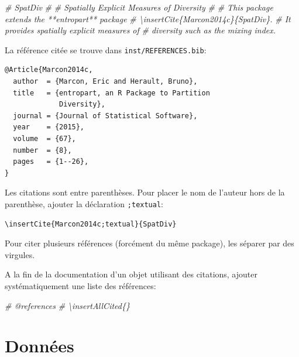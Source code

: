\documentclass[
  11pt,
  french,
  a4paper,
  extrafontsizes,onecolumn,openright
  ]{memoir}
\newenvironment{Shaded}{\begin{snugshade}}{\end{snugshade}}
\newcommand{\CommentTok}[1]{\textcolor[rgb]{0.56,0.35,0.01}{\textit{#1}}}
\begin{document}
\scriptsize

\begin{Shaded}
\begin{Highlighting}[]
\CommentTok{\#\textquotesingle{} SpatDiv}
\CommentTok{\#\textquotesingle{}}
\CommentTok{\#\textquotesingle{} Spatially Explicit Measures of Diversity}
\CommentTok{\#\textquotesingle{} }
\CommentTok{\#\textquotesingle{} This package extends the **entropart** package}
\CommentTok{\#\textquotesingle{} \textbackslash{}insertCite\{Marcon2014c\}\{SpatDiv\}.}
\CommentTok{\#\textquotesingle{} It provides spatially explicit measures of }
\CommentTok{\#\textquotesingle{} diversity such as the mixing index.}
\end{Highlighting}
\end{Shaded}

\normalsize

La référence citée se trouve dans \texttt{inst/REFERENCES.bib}:

\begin{verbatim}
@Article{Marcon2014c,
  author  = {Marcon, Eric and Herault, Bruno},
  title   = {entropart, an R Package to Partition 
             Diversity},
  journal = {Journal of Statistical Software},
  year    = {2015},
  volume  = {67},
  number  = {8},
  pages   = {1--26},
}
\end{verbatim}

Les citations sont entre parenthèses.
Pour placer le nom de l'auteur hors de la parenthèse, ajouter la déclaration \texttt{;textual}:

\begin{verbatim}
\insertCite{Marcon2014c;textual}{SpatDiv}
\end{verbatim}

Pour citer plusieurs références (forcément du même package), les séparer par des virgules.

A la fin de la documentation d'un objet utilisant des citations, ajouter systématiquement une liste des références:

\scriptsize

\begin{Shaded}
\begin{Highlighting}[]
\CommentTok{\#\textquotesingle{} @references}
\CommentTok{\#\textquotesingle{} \textbackslash{}insertAllCited\{\}}
\end{Highlighting}
\end{Shaded}

\normalsize

\hypertarget{donnuxe9es}{%
\section{Données}\label{donnuxe9es}}
\end{document}
